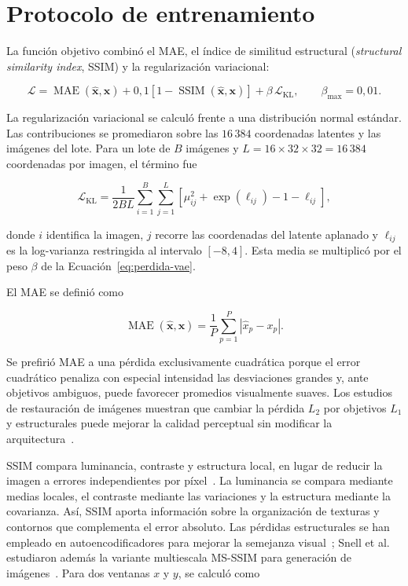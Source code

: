\section{Protocolo de entrenamiento}

La función objetivo combinó el MAE, el índice de similitud estructural (\emph{structural similarity
index}, SSIM) y la regularización variacional:

\begin{equation}
    \mathcal{L}
    = \operatorname{MAE}(\widehat{\mathbf{x}},\mathbf{x})
    +0,1\left[1-\operatorname{SSIM}(\widehat{\mathbf{x}},\mathbf{x})\right]
    +\beta\,\mathcal{L}_{\mathrm{KL}},
    \qquad \beta_{\max}=0,01 .
    \label{eq:perdida-vae}
\end{equation}

La regularización variacional se calculó frente a una distribución normal
estándar. Las contribuciones se promediaron sobre las \(16\,384\) coordenadas
latentes y las imágenes del lote. Para un lote de \(B\) imágenes y
\(L=16\times32\times32=16\,384\) coordenadas por imagen, el término fue

\begin{equation}
    \mathcal{L}_{\mathrm{KL}}
    =\frac{1}{2BL}\sum_{i=1}^{B}\sum_{j=1}^{L}
      \left[\mu_{ij}^{2}+\exp(\ell_{ij})-1-\ell_{ij}\right],
    \label{eq:kl-media-vae}
\end{equation}

donde \(i\) identifica la imagen, \(j\) recorre las coordenadas del latente
aplanado y \(\ell_{ij}\) es la log-varianza restringida al intervalo
\([-8,4]\). Esta media se multiplicó por el peso \(\beta\) de la
Ecuación~\eqref{eq:perdida-vae}.

El MAE se definió como

\begin{equation}
    \operatorname{MAE}(\widehat{\mathbf{x}},\mathbf{x})
    =\frac{1}{P}\sum_{p=1}^{P}\left|\widehat{x}_p-x_p\right|.
    \label{eq:mae}
\end{equation}

Se prefirió MAE a una pérdida exclusivamente cuadrática porque el error
cuadrático penaliza con especial intensidad las desviaciones grandes y, ante
objetivos ambiguos, puede favorecer promedios visualmente suaves. Los estudios
de restauración de imágenes muestran que cambiar la pérdida \(L_2\) por
objetivos \(L_1\) y estructurales puede mejorar la calidad perceptual sin
modificar la arquitectura~\cite{zhao_loss_2017}.

SSIM compara luminancia, contraste y estructura local, en lugar de reducir la
imagen a errores independientes por píxel~\cite{wang_image_2004}. La luminancia
se compara mediante medias locales, el contraste mediante las variaciones y la
estructura mediante la covarianza. Así, SSIM aporta información sobre la
organización de texturas y contornos que complementa el error absoluto.
Las pérdidas estructurales se han empleado en autoencodificadores para mejorar
la semejanza visual~\cite{timmins_ssim_2021}; Snell et al. estudiaron además
la variante multiescala MS-SSIM para generación de imágenes~\cite{snell_perceptual_2017}.
Para dos ventanas \(x\) y \(y\), se calculó como

